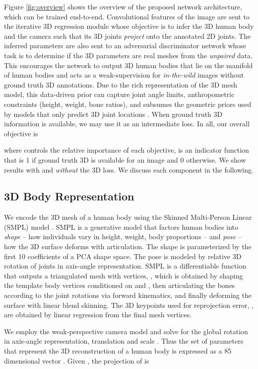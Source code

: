 \documentclass[10pt,twocolumn,letterpaper]{article}
\begin{document}
Figure \ref{fig:overview} shows the overview of the proposed network
architecture, which can be trained end-to-end. Convolutional
features of the image are sent to the iterative 3D regression
module whose objective is to infer the 3D human body and the camera such that
its 3D joints \emph{project} onto the annotated 2D joints. 
The inferred parameters are also sent to an adversarial discriminator network
whose task is to determine if the 3D parameters are real meshes from the
\emph{unpaired} data. This encourages the network to output 3D human
bodies that lie on the manifold of human bodies and acts as a weak-supervision for
\emph{in-the-wild} images without ground truth 3D annotations. Due to the rich
representation of the 3D mesh model, this data-driven prior can capture joint angle
limits, anthropometric constraints (\eg height, weight, bone ratios), and subsumes the geometric
priors used by models that only predict 3D joint locations \cite{ramakrishna2012reconstructing,Xiao2017,Xingyi2017}. 
When ground truth 3D information is available, we may use it as an intermediate
loss. In all, our overall objective is 

where  controls the relative importance of each objective,  is an indicator function that is 1 if ground truth 3D is available
for an image and 0 otherwise. We show results with and \emph{without} the 3D
loss. We discuss each component in the following.

\subsection{3D Body Representation}
We encode the 3D mesh of a human body using the  Skinned Multi-Person
Linear (SMPL) model \cite{SMPL}. SMPL is a
generative model that factors human bodies into \emph{shape} -- how individuals vary in height, weight, body proportions -- and \emph{pose} -- how the 3D
surface deforms with articulation. The shape  is
parameterized by the first 10 coefficients of a PCA shape space. The pose  is modeled by relative
3D rotation of  joints in axis-angle representation. SMPL is a differentiable function that outputs a triangulated mesh with 
vertices, , which is obtained by
shaping the template body vertices conditioned on  and , then
articulating the bones according to the joint rotations  via forward kinematics, and finally
deforming the surface with linear blend skinning. 
The 3D keypoints used for reprojection error, , are obtained by linear regression from the final mesh vertices.

We employ the weak-perspective camera model and solve for the global
rotation  in axis-angle representation, translation  and scale . Thus the set of parameters that represent the 3D reconstruction of a human
body is expressed as a 85 dimensional vector . Given
, the projection of  is
\end{document}
